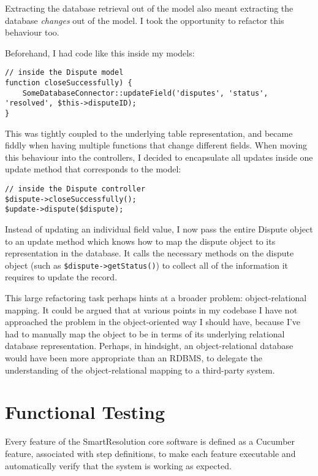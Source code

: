 Extracting the database retrieval out of the model also meant extracting the database \emph{changes} out of the model. I took the opportunity to refactor this behaviour too.

Beforehand, I had code like this inside my models:

\begin{lstlisting}
// inside the Dispute model
function closeSuccessfully) {
    SomeDatabaseConnector::updateField('disputes', 'status', 'resolved', $this->disputeID);
}
\end{lstlisting}

This was tightly coupled to the underlying table representation, and became fiddly when having multiple functions that change different fields. When moving this behaviour into the controllers, I decided to encapsulate all updates inside one update method that corresponds to the model:

\begin{lstlisting}
// inside the Dispute controller
$dispute->closeSuccessfully();
$update->dispute($dispute);
\end{lstlisting}

Instead of updating an individual field value, I now pass the entire Dispute object to an update method which knows how to map the dispute object to its representation in the database. It calls the necessary methods on the dispute object (such as \lstinline{$dispute->getStatus()}) to collect all of the information it requires to update the record. 

This large refactoring task perhaps hints at a broader problem: object-relational mapping. It could be argued that at various points in my codebase I have not approached the problem in the object-oriented way I should have, because I've had to manually map the object to be in terms of its underlying relational database representation. Perhaps, in hindsight, an object-relational database would have been more appropriate than an RDBMS, to delegate the understanding of the object-relational mapping to a third-party system.

\section{Functional Testing}

Every feature of the SmartResolution core software is defined as a Cucumber feature, associated with step definitions, to make each feature executable and automatically verify that the system is working as expected.

